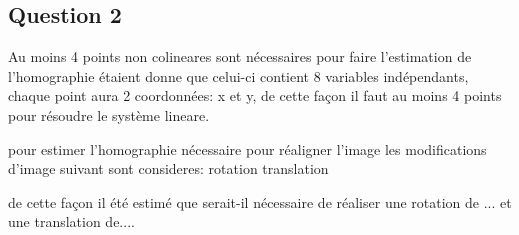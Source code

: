 \documentclass[../CSC_5RO17_TA_TP1.tex]{subfiles}
\begin{document}
\subsection*{Question 2}
Au moins 4 points non colineares sont nécessaires pour faire l'estimation de l'homographie étaient donne que celui-ci contient 8 variables indépendants, chaque point aura 2 coordonnées: x et y, de cette façon il faut au moins 4 points pour résoudre le système lineare.

pour estimer l'homographie nécessaire pour réaligner l'image les modifications d'image suivant sont consideres:
rotation
translation

de cette façon il été estimé que serait-il nécessaire de réaliser une rotation de ... et une translation de....
\end{document}
